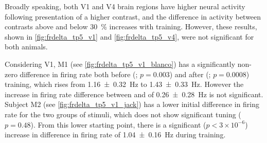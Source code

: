 %

\begin{figure}[htbp]%
    \centering
    \hspace*{\fill}
    \hspace*{\fill}\hspace{.2cm}\hspace*{\fill}
    \hspace*{\fill}
    \caption{
    \label{fig:frdelta_tp5_v1}
}
\end{figure}


Broadly speaking, both \ac{V1} and \ac{V4} brain regions have higher neural activity following presentation of a higher contrast, and the difference in activity between contrasts above and below \SI{30}{\percent} increases with training.
However, these results, shown in \autoref{fig:frdelta_tp5_v1} and \autoref{fig:frdelta_tp5_v4}, were not significant for both animals.

Considering \ac{V1}, \ac{M1} (see \autoref{fig:frdelta_tp5_v1_blanco}) has a significantly non-zero difference in firing rate both before (; $p=0.003$) and after (; $p=0.0008$) training, which rises from \SI{+1.16\pm0.32}{Hz} to \SI{+1.43\pm0.33}{Hz}.
However the increase in firing rate difference between  and  of \SI{+0.26\pm0.28}{Hz} is not significant.
Subject \ac{M2} (see \autoref{fig:frdelta_tp5_v1_jack}) has a lower initial difference in firing rate for the two groups of stimuli, which does not show significant tuning ($p=0.48$).
From this lower starting point, there is a significant ($p < 3 \times 10^{-6}$) increase in difference in firing rate of \SI{+1.04\pm0.16}{Hz} during training.


